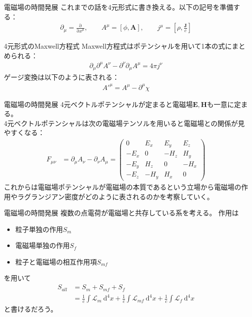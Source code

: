 \documentclass[unicode, aspectratio=169, 12pt]{beamer}
\newcommand{\pdiff}[2]{\frac{\mathrm{\partial} #1}{\mathrm{\partial} #2}} %
\begin{document}
\begin{frame}{電磁場の時間発展}
    これまでの話を4元形式に書き換える。以下の記号を準備する：
    \begin{align*}
        \partial_\mu=\pdiff{}{x^\mu},\qquad
        A^\mu=[\phi,\bm{A}],\qquad
        j^\mu=[\rho,\frac{\bm{J}}{c}]
    \end{align*}
    \vspace{-0.8cm}
    \begin{block}{4元形式のMaxwell方程式}
    Maxwell方程式はポテンシャルを用いて1本の式にまとめられる：
    \begin{align*}
        \partial_\mu\partial^\mu A^\nu - \partial^\nu\partial_\mu A^\mu=4\pi j^\nu
    \end{align*}
    ゲージ変換は以下のように表される：
    \begin{align*}
        A'^\mu=A^\mu-\partial^\mu\chi
    \end{align*}
    \end{block}
\end{frame}

\begin{frame}{電磁場の時間発展}
    4元ベクトルポテンシャルが定まると電磁場$\bm{E},\bm{H}$も一意に定まる。\\
    4元ベクトルポテンシャルは次の電磁場テンソルを用いると電磁場との関係が見やすくなる：
    \begin{align*}
        F_{\mu\nu}&=\partial_\mu A_\nu-\partial_\nu A_\mu
        =
        \begin{pmatrix}
    0 & E_x & E_y & E_z \\
    -E_x & 0 & -H_z & H_y \\
    -E_y & H_z & 0 & -H_x \\
    -E_z & -H_y & H_x & 0
        \end{pmatrix}
    \end{align*}
    これからは電磁場ポテンシャルが電磁場の本質であるという立場から電磁場の作用やラグランジアン密度がどのように表されるのかを考察していく。
\end{frame}

\begin{frame}{電磁場の時間発展}
    複数の点電荷が電磁場と共存している系を考える。
    作用は
    \begin{itemize}
        \item 粒子単独の作用$S_m$
        \item 電磁場単独の作用$S_f$
        \item 粒子と電磁場の相互作用項$S_{mf}$
    \end{itemize}
    を用いて
    \begin{align*}
        S_{all}
        &=S_m+S_{mf}+S_f\\
        &=\frac{1}{c}\int \mathcal{L}_m\>\mathrm{d}^4x+\frac{1}{c}\int \mathcal{L}_{mf}\>\mathrm{d}^4x+\frac{1}{c}\int \mathcal{L}_f\>\mathrm{d}^4x
    \end{align*}
    と書けるだろう。\\
\end{frame}
\end{document}
